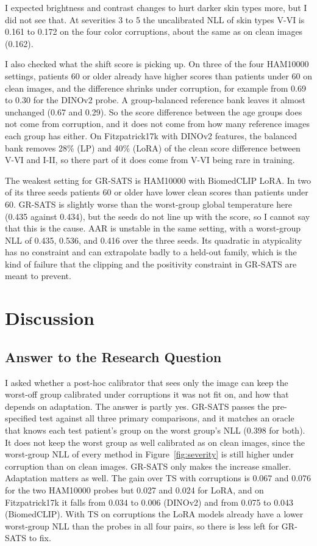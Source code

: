 \documentclass[sigconf,nonacm]{acmart}
\begin{document}
I expected brightness and contrast changes to hurt darker skin types more, but I did not see that. At severities 3 to 5 the uncalibrated NLL of skin types V-VI is 0.161 to 0.172 on the four color corruptions, about the same as on clean images (0.162).

I also checked what the shift score is picking up. On three of the four HAM10000 settings, patients 60 or older already have higher scores than patients under 60 on clean images, and the difference shrinks under corruption, for example from 0.69 to 0.30 for the DINOv2 probe. A group-balanced reference bank leaves it almost unchanged (0.67 and 0.29). So the score difference between the age groups does not come from corruption, and it does not come from how many reference images each group has either. On Fitzpatrick17k with DINOv2 features, the balanced bank removes 28\% (LP) and 40\% (LoRA) of the clean score difference between V-VI and I-II, so there part of it does come from V-VI being rare in training.

The weakest setting for GR-SATS is HAM10000 with BiomedCLIP LoRA. In two of its three seeds patients 60 or older have lower clean scores than patients under 60. GR-SATS is slightly worse than the worst-group global temperature here (0.435 against 0.434), but the seeds do not line up with the score, so I cannot say that this is the cause. AAR is unstable in the same setting, with a worst-group NLL of 0.435, 0.536, and 0.416 over the three seeds. Its quadratic in atypicality has no constraint and can extrapolate badly to a held-out family, which is the kind of failure that the clipping and the positivity constraint in GR-SATS are meant to prevent.

\section{Discussion}
\label{sec:discussion}

\subsection{Answer to the Research Question}

I asked whether a post-hoc calibrator that sees only the image can keep the worst-off group calibrated under corruptions it was not fit on, and how that depends on adaptation. The answer is partly yes. GR-SATS passes the pre-specified test against all three primary comparisons, and it matches an oracle that knows each test patient's group on the worst group's NLL (0.398 for both). It does not keep the worst group as well calibrated as on clean images, since the worst-group NLL of every method in Figure~\ref{fig:severity} is still higher under corruption than on clean images. GR-SATS only makes the increase smaller. Adaptation matters as well. The gain over TS with corruptions is 0.067 and 0.076 for the two HAM10000 probes but 0.027 and 0.024 for LoRA, and on Fitzpatrick17k it falls from 0.034 to 0.006 (DINOv2) and from 0.075 to 0.043 (BiomedCLIP). With TS on corruptions the LoRA models already have a lower worst-group NLL than the probes in all four pairs, so there is less left for GR-SATS to fix.
\end{document}

